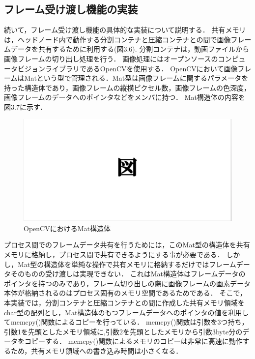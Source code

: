 \subsection*{フレーム受け渡し機能の実装}

続いて，フレーム受け渡し機能の具体的な実装について説明する．
共有メモリは，ヘッドノード内で動作する分割コンテナと圧縮コンテナとの間で画像フレームデータを共有するために利用する(図3.6).
分割コンテナは，動画ファイルから画像フレームの切り出し処理を行う．
画像処理にはオープンソースのコンピュータビジョンライブラリであるOpenCVを使用する．
OpenCVにおいて画像フレームはMatという型で管理される．Mat型は画像フレームに関するパラメータを持った構造体であり，画像フレームの縦横ピクセル数，画像フレームの色深度，画像フレームのデータへのポインタなどをメンバに持つ．
Mat構造体の内容を図3.7に示す．

\begin{figure}[H]
    \hspace*{\fill}
    \includegraphics[width=\linewidth]{./fig/dummy.eps}
    \hspace*{\fill}
    \caption{OpenCVにおけるMat構造体}
\end{figure}

プロセス間でのフレームデータ共有を行うためには，このMat型の構造体を共有メモリに格納し，プロセス間で共有できるようにする事が必要である．
しかし，Mat型の構造体を単純な操作で共有メモリに格納するだけではフレームデータそのものの受け渡しは実現できない．
これはMat構造体はフレームデータのポインタを持つのみであり，フレーム切り出しの際に画像フレームの画素データ本体が格納されるのはプロセス固有のメモリ空間であるためである．
そこで，本実装では，分割コンテナと圧縮コンテナとの間に作成した共有メモリ領域をchar型の配列とし，Mat構造体のもつフレームデータへのポインタの値を利用してmemcpy()関数によるコピーを行っている．
memcpy()関数は引数を3つ持ち，引数1を先頭としたメモリ領域に,引数2を先頭としたメモリから引数3byte分のデータをコピーする．
memcpy()関数によるメモリのコピーは非常に高速に動作するため，共有メモリ領域への書き込み時間は小さくなる．

